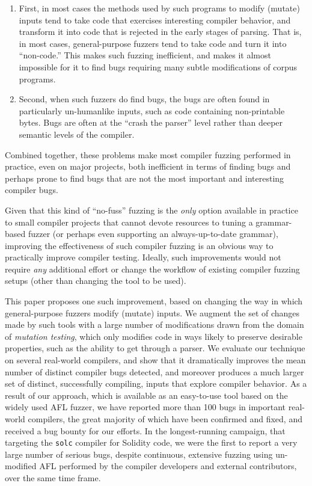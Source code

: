 \begin{enumerate}
\item First, in most cases the methods used by such programs to modify
  (mutate) inputs tend to take code that exercises interesting
  compiler behavior, and transform it into code that is rejected in
  the early stages of parsing.  That is, in most cases,
  general-purpose fuzzers tend to take code and turn it into
  ``non-code.''  This makes such fuzzing inefficient, and makes it
  almost impossible for it to find bugs requiring many subtle
  modifications of corpus programs.
  \item Second, when such fuzzers do find bugs, the bugs are often
    found in particularly un-humanlike inputs, such as code
    containing non-printable bytes.  Bugs are often at the ``crash the
    parser'' level rather than deeper semantic levels of the compiler.
  \end{enumerate}

  Combined together, these problems make most compiler fuzzing
  performed in practice, even on major projects, both inefficient in
  terms of finding bugs and perhaps prone to find bugs that are not
  the most important and interesting compiler bugs.

  Given that this kind of ``no-fuss'' fuzzing is the \emph{only} option available in
  practice to small compiler projects that cannot devote resources to
  tuning a grammar-based fuzzer (or perhaps even supporting an
  always-up-to-date grammar), improving the effectiveness of such
  compiler fuzzing is an obvious way to practically improve compiler
  testing.  Ideally, such improvements would not require \emph{any}
  additional effort or change the workflow of existing compiler
  fuzzing setups (other than changing the  tool to be used).

  This paper proposes one such improvement, based on changing the way
  in which general-purpose fuzzers modify (mutate) inputs.  We augment
  the set of changes made by such tools with a large number of
  modifications drawn from the domain of \emph{mutation testing},
  which only modifies code in ways likely to preserve desirable
  properties, such as the ability to get through a parser.  We evaluate
  our technique on several real-world compilers, and show that it
  dramatically improves the mean number of distinct compiler bugs
  detected, and moreover produces a much larger set of distinct,
  successfully compiling, inputs that explore compiler behavior.  As a
  result of our approach, which is available as an easy-to-use tool
  based on the widely used AFL fuzzer, we have reported more than 100
  bugs in important real-world compilers, the great majority of
  which have been confirmed and fixed, and received a bug bounty for
  our efforts.  In the longest-running campaign, that targeting the
  {\tt solc} compiler for Solidity code, we were the first to
  report a very large number of serious bugs, despite continuous, extensive
  fuzzing using un-modified AFL performed by the compiler developers
  and external contributors, over the same time frame.
